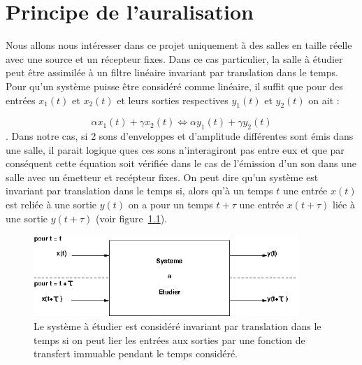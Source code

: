 \chapter{Principe de l'auralisation}

Nous allons nous intéresser dans ce projet uniquement à des salles en taille réelle avec une source et un récepteur
fixes. Dans ce cas particulier, la salle à étudier peut être assimilée à un filtre linéaire invariant par
translation dans le temps. 
Pour qu'un système puisse être considéré comme linéaire, il suffit que pour des entrées $x_1(t)$ et $x_2(t)$ et
leurs sorties respectives $y_1(t)$ et $y_2(t)$ on ait :

\begin{equation}
\alpha x_1(t) + \gamma x_2(t) \Leftrightarrow \alpha y_1(t) + \gamma y_2(t)
\end{equation}.
Dans notre cas, si 2 sons d'enveloppes et d'amplitude différentes sont émis dans une salle, il parait
logique ques ces sons n'interagiront pas entre eux et que par conséquent cette équation soit vérifiée dans
le cas de l'émission d'un son dans une salle avec un émetteur et recépteur fixes.
On peut dire qu'un système est invariant par translation dans le temps si, alors qu'à un temps $t$ une
entrée $x(t)$ est reliée à une sortie $y(t)$ on a pour un temps $t+\tau$ une entrée $x(t+\tau)$ liée à une
sortie $y(t+\tau)$ (voir figure~\ref{systeme_invariant}).

\begin{figure}[h!]
\begin{center}
\includegraphics[width=10cm]{systeme_invariant.png}
\end{center}
\caption{\label{systeme_invariant} Le système à étudier est considéré invariant par translation dans le
temps si on peut lier les entrées aux sorties par une fonction de transfert immuable pendant le temps
considéré.}
\end{figure}


